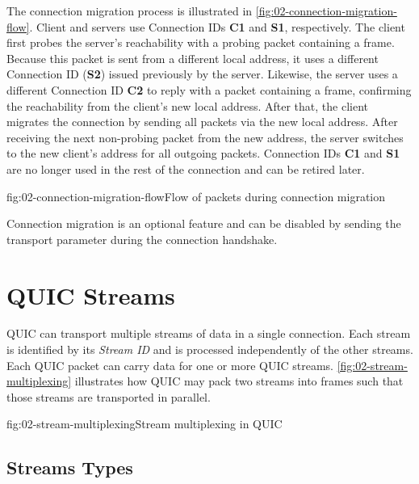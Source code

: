 The connection migration process is illustrated in \autoref{fig:02-connection-migration-flow}.
Client and servers use Connection IDs \textbf{C1} and \textbf{S1}, respectively. The client first
probes the server's reachability with a probing packet containing a \PATHCHALLENGE{} frame. Because
this packet is sent from a different local address, it uses a different Connection ID (\textbf{S2})
issued previously by the server. Likewise, the server uses a different Connection ID \textbf{C2} to
reply with a packet containing a \PATHRESPONSE{} frame, confirming the reachability from the
client's new local address. After that, the client migrates the connection by sending all packets
via the new local address. After receiving the next non-probing packet from the new address, the
server switches to the new client's address for all outgoing packets. Connection IDs \textbf{C1} and
\textbf{S1} are no longer used in the rest of the connection and can be retired later.

\begin{myFigure}{fig:02-connection-migration-flow}{Flow of packets during connection migration}

\resizebox{\linewidth}{!}{}

\end{myFigure}

Connection migration is an optional feature and can be disabled by sending the
\DisableActiveMigration{} transport parameter during the connection handshake.

\section{QUIC Streams}

QUIC can transport multiple streams of data in a single connection. Each stream is identified by its
\textit{Stream ID} and is processed independently of the other streams. Each QUIC packet can carry
data for one or more QUIC streams. \autoref{fig:02-stream-multiplexing} illustrates how QUIC may
pack two streams into frames such that those streams are transported in parallel.

\begin{myFigure}{fig:02-stream-multiplexing}{Stream multiplexing in QUIC}

  

\end{myFigure}

\subsection{Streams Types}\label{sec:02-stream-types}

